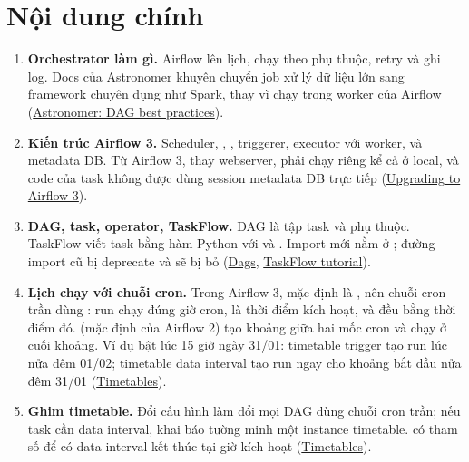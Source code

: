 \section{Nội dung chính}
\begin{enumerate}
  \item \textbf{Orchestrator làm gì.} Airflow lên lịch, chạy theo phụ thuộc, retry và ghi log. Docs của Astronomer khuyên chuyển job xử lý dữ liệu lớn sang framework chuyên dụng như Spark, thay vì chạy trong worker của Airflow (\href{https://www.astronomer.io/docs/airflow/dag-best-practices}{Astronomer: DAG best practices}).
  \item \textbf{Kiến trúc Airflow 3.} Scheduler, , , triggerer, executor với worker, và metadata DB. Từ Airflow 3,  thay webserver,  phải chạy riêng kể cả ở local, và code của task không được dùng session metadata DB trực tiếp (\href{https://airflow.apache.org/docs/apache-airflow/stable/installation/upgrading_to_airflow3.html}{Upgrading to Airflow 3}).
  \item \textbf{DAG, task, operator, TaskFlow.} DAG là tập task và phụ thuộc. TaskFlow viết task bằng hàm Python với  và . Import mới nằm ở ; đường import cũ bị deprecate và sẽ bị bỏ (\href{https://airflow.apache.org/docs/apache-airflow/stable/core-concepts/dags.html}{Dags}, \href{https://airflow.apache.org/docs/apache-airflow/stable/tutorial/taskflow.html}{TaskFlow tutorial}).
  \item \textbf{Lịch chạy với chuỗi cron.} Trong Airflow 3,  mặc định là , nên chuỗi cron trần dùng : run chạy đúng giờ cron,  là thời điểm kích hoạt,  và  đều bằng thời điểm đó.  (mặc định của Airflow 2) tạo khoảng giữa hai mốc cron và chạy ở cuối khoảng. Ví dụ  bật lúc 15 giờ ngày 31/01: timetable trigger tạo run lúc nửa đêm 01/02; timetable data interval tạo run ngay cho khoảng bắt đầu nửa đêm 31/01 (\href{https://airflow.apache.org/docs/apache-airflow/stable/authoring-and-scheduling/timetable.html}{Timetables}).
  \item \textbf{Ghim timetable.} Đổi cấu hình  làm đổi mọi DAG dùng chuỗi cron trần; nếu task cần data interval, khai báo tường minh một instance timetable.  có tham số  để có data interval kết thúc tại giờ kích hoạt (\href{https://airflow.apache.org/docs/apache-airflow/stable/authoring-and-scheduling/timetable.html}{Timetables}).

\end{enumerate}
